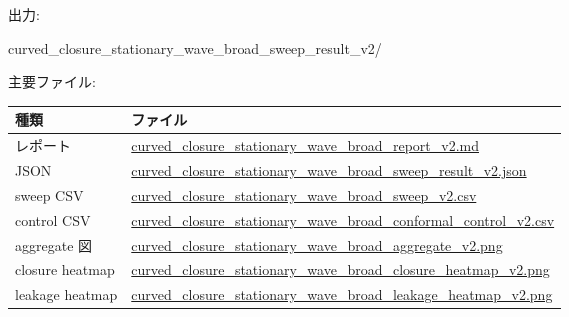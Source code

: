 \documentclass[
  a4paper,
]{article}
\newenvironment{Shaded}{}{}
\newcommand{\NormalTok}[1]{#1}
\newcounter{none} %
\begin{document}
出力:

\begin{Shaded}
\begin{Highlighting}[]
\NormalTok{curved\_closure\_stationary\_wave\_broad\_sweep\_result\_v2/}
\end{Highlighting}
\end{Shaded}

主要ファイル:

{\def\LTcaptype{none} %
\begin{longtable}[]{@{}
  >{\raggedright\arraybackslash}p{}
  >{\raggedright\arraybackslash}p{}@{}}
\toprule\noalign{}
\begin{minipage}[b]{\linewidth}\raggedright
種類
\end{minipage} & \begin{minipage}[b]{\linewidth}\raggedright
ファイル
\end{minipage} \\
\midrule\noalign{}
\endhead
\bottomrule\noalign{}
\endlastfoot
レポート &
\href{curved_closure_stationary_wave_broad_sweep_result_v2/curved_closure_stationary_wave_broad_report_v2.md}{curved\_closure\_stationary\_wave\_broad\_report\_v2.md} \\
JSON &
\href{curved_closure_stationary_wave_broad_sweep_result_v2/curved_closure_stationary_wave_broad_sweep_result_v2.json}{curved\_closure\_stationary\_wave\_broad\_sweep\_result\_v2.json} \\
sweep CSV &
\href{curved_closure_stationary_wave_broad_sweep_result_v2/curved_closure_stationary_wave_broad_sweep_v2.csv}{curved\_closure\_stationary\_wave\_broad\_sweep\_v2.csv} \\
control CSV &
\href{curved_closure_stationary_wave_broad_sweep_result_v2/curved_closure_stationary_wave_broad_conformal_control_v2.csv}{curved\_closure\_stationary\_wave\_broad\_conformal\_control\_v2.csv} \\
aggregate 図 &
\href{curved_closure_stationary_wave_broad_sweep_result_v2/curved_closure_stationary_wave_broad_aggregate_v2.png}{curved\_closure\_stationary\_wave\_broad\_aggregate\_v2.png} \\
closure heatmap &
\href{curved_closure_stationary_wave_broad_sweep_result_v2/curved_closure_stationary_wave_broad_closure_heatmap_v2.png}{curved\_closure\_stationary\_wave\_broad\_closure\_heatmap\_v2.png} \\
leakage heatmap &
\href{curved_closure_stationary_wave_broad_sweep_result_v2/curved_closure_stationary_wave_broad_leakage_heatmap_v2.png}{curved\_closure\_stationary\_wave\_broad\_leakage\_heatmap\_v2.png} \\
\end{longtable}
}
\end{document}
